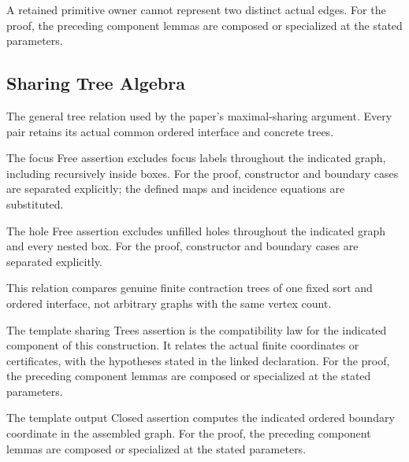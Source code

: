 A retained primitive owner cannot represent two distinct actual edges.
For the proof, the preceding component lemmas are composed or specialized at the stated parameters.
\par{}

\subsection{Sharing Tree Algebra}
The general tree relation used by the paper's maximal-sharing argument. Every pair retains its actual common ordered interface and concrete trees.

The focus Free assertion excludes focus labels throughout the indicated graph, including recursively inside boxes.
For the proof, constructor and boundary cases are separated explicitly; the defined maps and incidence equations are substituted.
\par{}

The hole Free assertion excludes unfilled holes throughout the indicated graph and every nested box.
For the proof, constructor and boundary cases are separated explicitly.
\par{}

This relation compares genuine finite contraction trees of one fixed sort and ordered interface, not arbitrary graphs with the same vertex count.
\par{}

The template sharing Trees assertion is the compatibility law for the indicated component of this construction. It relates the actual finite coordinates or certificates, with the hypotheses stated in the linked declaration.
For the proof, the preceding component lemmas are composed or specialized at the stated parameters.
\par{}

The template output Closed assertion computes the indicated ordered boundary coordinate in the assembled graph.
For the proof, the preceding component lemmas are composed or specialized at the stated parameters.
\par{}

